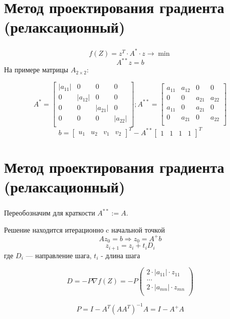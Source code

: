 \documentclass{beamer}
\begin{document}
\section{Метод проектирования градиента (релаксационный)}
\begin{frame}
	\frametitle{\insertsection}
	$$f(Z) = z^T \cdot A^* \cdot z \to \min$$
	$$A^{**}z=b$$
	На примере матрицы $A_{2 \times 2}$:
	
	$$A^* = \begin{bmatrix}
	|a_{11}| & 0 & 0 & 0 \\
	0 & |a_{12}| & 0 & 0 \\
	0 & 0 & |a_{21}| & 0 \\
	0 & 0 & 0 & |a_{22}| \\
	\end{bmatrix}; 
	A^{**} = \begin{bmatrix}
	a_{11} & a_{12} & 0 & 0 \\
	0 & 0 & a_{21} & a_{22} \\
	a_{11} & 0 & a_{21} & 0 \\
	0 & a_{21} & 0 & a_{22} \\
	\end{bmatrix}$$
	$$b = \begin{bmatrix} u_1 & u_2 & v_1 & v_2 \end{bmatrix}^T - A^{**}\begin{bmatrix} 1 & 1 & 1 & 1 \end{bmatrix}^T$$
	
\end{frame}

\section{Метод проектирования градиента (релаксационный)}
\begin{frame}
	\frametitle{\insertsection}
	
	Переобозначим для краткости $A^{**} := A$. 
	
	Решение находится итерационно c начальной точкой
	$$Az_0 = b \Rightarrow z_0 = A^+b $$
	$$z_{i+1} = z_i + t_iD_i$$ где $D_i$ — направление шага, $t_i$ - длина шага
	
	$$D = -P \nabla f(Z) = -P 
	\begin{pmatrix} 
	2 \cdot |a_{11}| \cdot z_{11} \\
	... \\
	2 \cdot |a_{mn}| \cdot z_{mn} \\
	\end{pmatrix}$$
	
	$$P = I - A^T(AA^T)^{-1}A = I - A^+A$$
	
\end{frame}
\end{document}
